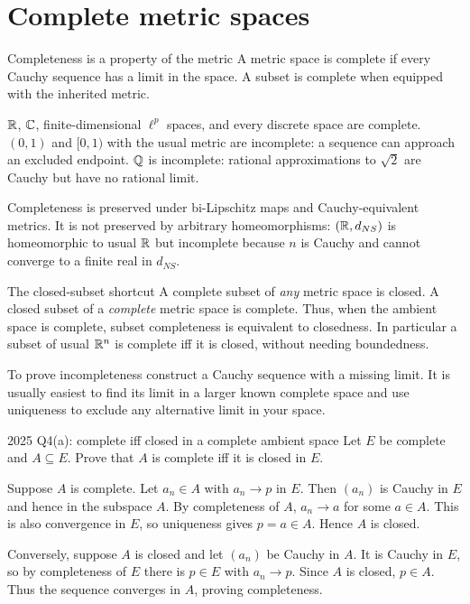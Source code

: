 \clearpage
\setcounter{section}{4}
\section{Complete metric spaces}

\begin{note}{Completeness is a property of the metric}
A metric space is complete if every Cauchy sequence has a limit in the space. A subset is complete when equipped with the inherited metric.

$\mathbb R$, $\mathbb C$, finite-dimensional $\ell^p$ spaces, and every discrete space are complete. $(0,1)$ and $[0,1)$ with the usual metric are incomplete: a sequence can approach an excluded endpoint. $\mathbb Q$ is incomplete: rational approximations to $\sqrt2$ are Cauchy but have no rational limit.

Completeness is preserved under bi-Lipschitz maps and Cauchy-equivalent metrics. It is not preserved by arbitrary homeomorphisms: $(\mathbb R,d_{NS})$ is homeomorphic to usual $\mathbb R$ but incomplete because $n$ is Cauchy and cannot converge to a finite real in $d_{NS}$.
\end{note}
\begin{method}{The closed-subset shortcut}
A complete subset of \emph{any} metric space is closed. A closed subset of a \emph{complete} metric space is complete. Thus, when the ambient space is complete, subset completeness is equivalent to closedness. In particular a subset of usual $\mathbb R^n$ is complete iff it is closed, without needing boundedness.

To prove incompleteness construct a Cauchy sequence with a missing limit. It is usually easiest to find its limit in a larger known complete space and use uniqueness to exclude any alternative limit in your space.
\end{method}
\begin{exam}{2025 Q4(a): complete iff closed in a complete ambient space}
Let $E$ be complete and $A\subseteq E$. Prove that $A$ is complete iff it is closed in $E$.
\end{exam}
\begin{answer}
Suppose $A$ is complete. Let $a_n\in A$ with $a_n\to p$ in $E$. Then $(a_n)$ is Cauchy in $E$ and hence in the subspace $A$. By completeness of $A$, $a_n\to a$ for some $a\in A$. This is also convergence in $E$, so uniqueness gives $p=a\in A$. Hence $A$ is closed.

Conversely, suppose $A$ is closed and let $(a_n)$ be Cauchy in $A$. It is Cauchy in $E$, so by completeness of $E$ there is $p\in E$ with $a_n\to p$. Since $A$ is closed, $p\in A$. Thus the sequence converges in $A$, proving completeness.
\end{answer}
